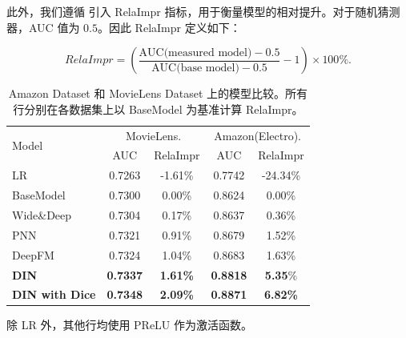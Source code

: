 此外，我们遵循 \cite{yan2014coupled} 引入 RelaImpr 指标，用于衡量模型的相对提升。对于随机猜测器，AUC 值为 $0.5$。因此 RelaImpr 定义如下：
\begin{small}
\begin{equation}
RelaImpr = \left(\frac{\text{AUC(measured model)} -0.5}{\text{AUC(base model)} - 0.5} - 1\right) \times 100\%.
\end{equation}
\end{small}



\begin{table}[!t]
\caption{Amazon Dataset 和 MovieLens Dataset 上的模型比较。所有行分别在各数据集上以 BaseModel 为基准计算 RelaImpr。}
\centering
\begin{threeparttable}
\begin{tabular}{lcccc}
\toprule
\multirow{2}{*}{Model}  & \multicolumn{2}{c}{MovieLens.} & \multicolumn{2}{c}{Amazon(Electro).}  \\ 
& AUC & RelaImpr & AUC & RelaImpr \\ \midrule
LR  & 0.7263 & -1.61\% & 0.7742 & -24.34\%  \\
BaseModel & 0.7300 & 0.00\% & 0.8624 & 0.00\%  \\
Wide\&Deep & 0.7304 & 0.17\% & 0.8637 & 0.36\%  \\
PNN  & 0.7321 & 0.91\% & 0.8679 & 1.52\%  \\
DeepFM  & 0.7324 & 1.04\% & 0.8683 & 1.63\% \\
\textbf{DIN} & \textbf{0.7337} & \textbf{1.61\%} & \textbf{0.8818} & \textbf{5.35}\%\\
\textbf{DIN with Dice}\tnote{a} & \textbf{0.7348} & \textbf{2.09\%} & \textbf{0.8871} & \textbf{6.82\%} \\ \bottomrule
\end{tabular}
\begin{tablenotes}%
        \item[a] 除 LR 外，其他行均使用 PReLU 作为激活函数。
      \end{tablenotes}
      \end{threeparttable}
\label{table:exptablePublic}
\end{table}
\vspace*{-0.4cm}






